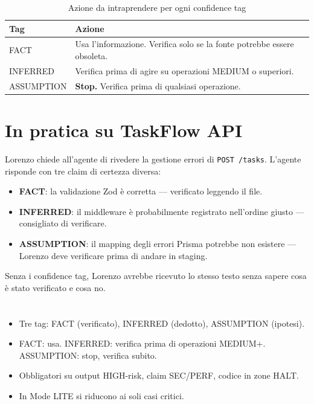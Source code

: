 \begin{table}[htbp]
  \centering
  \begin{tabular}{ll}
    \toprule
    \textbf{Tag} & \textbf{Azione} \\
    \midrule
    FACT & Usa l'informazione. Verifica solo se la fonte potrebbe essere obsoleta. \\
    INFERRED & Verifica prima di agire su operazioni MEDIUM o superiori. \\
    ASSUMPTION & \textbf{Stop.} Verifica prima di qualsiasi operazione. \\
    \bottomrule
  \end{tabular}
  \caption{Azione da intraprendere per ogni confidence tag}
  \label{tab:09-azioni}
\end{table}

\section{In pratica su TaskFlow API}
\label{sec:09-pratica}

Lorenzo chiede all'agente di rivedere la gestione errori di \texttt{POST /tasks}. L'agente risponde con tre claim di certezza diversa:

\begin{itemize}
  \item \textbf{FACT}: la validazione Zod è corretta --- verificato leggendo il file.
  \item \textbf{INFERRED}: il middleware è probabilmente registrato nell'ordine giusto --- consigliato di verificare.
  \item \textbf{ASSUMPTION}: il mapping degli errori Prisma potrebbe non esistere --- Lorenzo deve verificare prima di andare in staging.
\end{itemize}

Senza i confidence tag, Lorenzo avrebbe ricevuto lo stesso testo senza sapere cosa è stato verificato e cosa no.

\section*{\LabelSummary}

\begin{itemize}
  \item Tre tag: FACT (verificato), INFERRED (dedotto), ASSUMPTION (ipotesi).
  \item FACT: usa. INFERRED: verifica prima di operazioni MEDIUM+. ASSUMPTION: stop, verifica subito.
  \item Obbligatori su output HIGH-risk, claim SEC/PERF, codice in zone HALT.
  \item In Mode LITE si riducono ai soli casi critici.
\end{itemize}
